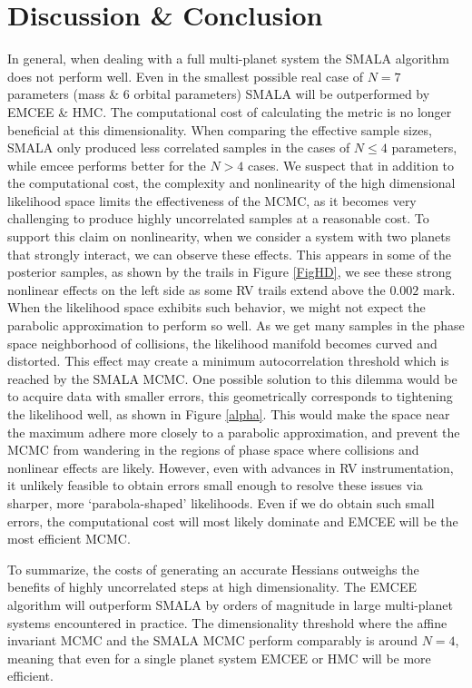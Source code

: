 \documentclass{aa}
\begin{document}
\section{Discussion \& Conclusion}
In general, when dealing with a full multi-planet system the SMALA algorithm does not perform well. 
Even in the smallest possible real case of $N=7$ parameters (mass \& 6 orbital parameters) SMALA will be outperformed by EMCEE \& HMC. 
The computational cost of calculating the metric is no longer beneficial at this dimensionality. 
When comparing the effective sample sizes, SMALA only produced less correlated samples in the cases of $N \leq 4$ parameters, while emcee performs better for the $N>4$ cases. 
We suspect that in addition to the computational cost, the complexity and nonlinearity of the high dimensional likelihood space limits the effectiveness of the MCMC, as it becomes very challenging to produce highly uncorrelated samples at a reasonable cost. 
To support this claim on nonlinearity, when we consider a system with two planets that strongly interact, we can observe these effects. 
This appears in some of the posterior samples, as shown by the trails in Figure \ref{FigHD}, we see these strong nonlinear effects on the left side as some RV trails extend above the $0.002$ mark. 
When the likelihood space exhibits such behavior, we might not expect the parabolic approximation to perform so well. 
As we get many samples in the phase space neighborhood of collisions, the likelihood manifold becomes curved and distorted. 
This effect may create a minimum autocorrelation threshold which is reached by the SMALA MCMC. 
One possible solution to this dilemma would be to acquire data with smaller errors, this geometrically corresponds to tightening the likelihood well, as shown in Figure \ref{alpha}.  
This would make the space near the maximum adhere more closely to a parabolic approximation, and prevent the MCMC from wandering in the regions of phase space where collisions and nonlinear effects are likely. 
However, even with advances in RV instrumentation, it unlikely feasible to obtain errors small enough to resolve these issues via sharper, more `parabola-shaped' likelihoods. 
Even if we do obtain such small errors, the computational cost will most likely dominate and EMCEE will be the most efficient MCMC.

To summarize, the costs of generating an accurate Hessians outweighs the benefits of highly uncorrelated steps at high dimensionality. 
The EMCEE algorithm will outperform SMALA by orders of magnitude in large multi-planet systems encountered in practice. 
The dimensionality threshold where the affine invariant MCMC and the SMALA MCMC perform comparably is around $N = 4$, meaning that even for a single planet system EMCEE or HMC will be more efficient.
\end{document}
